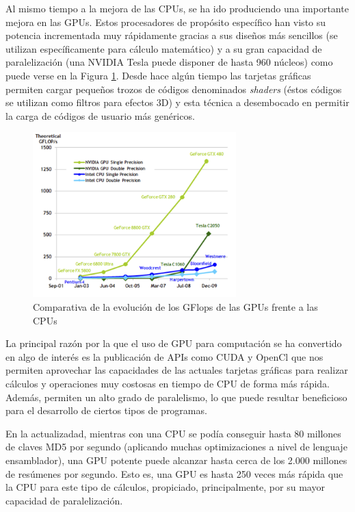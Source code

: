 Al mismo tiempo a la mejora de las CPUs, se ha ido produciendo una importante mejora en las GPUs. Estos procesadores de propósito específico han visto su potencia incrementada muy rápidamente gracias a sus diseños más sencillos (se utilizan específicamente para cálculo matemático) y a su gran capacidad de paralelización (una NVIDIA Tesla puede disponer de hasta 960 núcleos) como puede verse en la Figura \ref{fig:GPUvsCPU}. Desde hace algún tiempo las tarjetas gráficas permiten cargar pequeños trozos de códigos denominados \emph{shaders} (éstos códigos se utilizan como filtros para efectos 3D) y esta técnica a desembocado en permitir la carga de códigos de usuario más genéricos.

\begin{figure}
	\centering
	\includegraphics[width=0.7\textwidth]{images/evolucion-gpu.png}
	\caption{Comparativa de la evolución de los GFlops de las GPUs frente a las CPUs\cite{nvidia:cuda_c_programming_guide}}\label{fig:GPUvsCPU}
\end{figure}

La principal razón por la que el uso de GPU para computación se ha convertido en algo de interés es la publicación de APIs como CUDA y OpenCl que nos permiten aprovechar las capacidades de las actuales tarjetas gráficas para realizar cálculos y operaciones muy costosas en tiempo de CPU de forma más rápida. Además, permiten un alto grado de paralelismo, lo que puede resultar beneficioso para el desarrollo de ciertos tipos de programas.

En la actualizadad, mientras con una CPU se podía conseguir hasta 80 millones de claves MD5 por segundo (aplicando muchas optimizaciones a nivel de lenguaje ensamblador), una GPU potente puede alcanzar hasta cerca de los 2.000 millones de resúmenes por segundo. Esto es, una GPU es hasta 250 veces más rápida que la CPU para este tipo de cálculos, propiciado, principalmente, por su mayor capacidad de paralelización.

